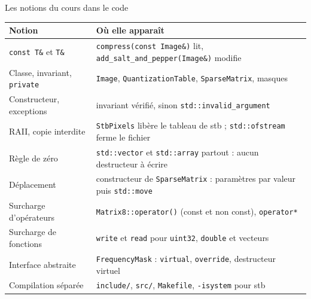 \documentclass[aspectratio=169,10pt]{beamer}
\newcommand{\code}[1]{\texttt{#1}}
\begin{document}
\begin{frame}{Les notions du cours dans le code}
  \small
  \begin{tabular}{@{}L{4.1cm}L{9.4cm}@{}}
    \toprule
    Notion & Où elle apparaît \\
    \midrule
    \code{const T\&} et \code{T\&} & \code{compress(const Image\&)} lit, \code{add\_salt\_and\_pepper(Image\&)} modifie \\
    Classe, invariant, \code{private} & \code{Image}, \code{QuantizationTable}, \code{SparseMatrix}, masques \\
    Constructeur, exceptions & invariant vérifié, sinon \code{std::invalid\_argument} \\
    RAII, copie interdite & \code{StbPixels} libère le tableau de stb ; \code{std::ofstream} ferme le fichier \\
    Règle de zéro & \code{std::vector} et \code{std::array} partout : aucun destructeur à écrire \\
    Déplacement & constructeur de \code{SparseMatrix} : paramètres par valeur puis \code{std::move} \\
    Surcharge d'opérateurs & \code{Matrix8::operator()} (const et non const), \code{operator*} \\
    Surcharge de fonctions & \code{write} et \code{read} pour \code{uint32}, \code{double} et vecteurs \\
    Interface abstraite & \code{FrequencyMask} : \code{virtual}, \code{override}, destructeur virtuel \\
    Compilation séparée & \code{include/}, \code{src/}, \code{Makefile}, \code{-isystem} pour stb \\
    \bottomrule
  \end{tabular}
\end{frame}
\end{document}
